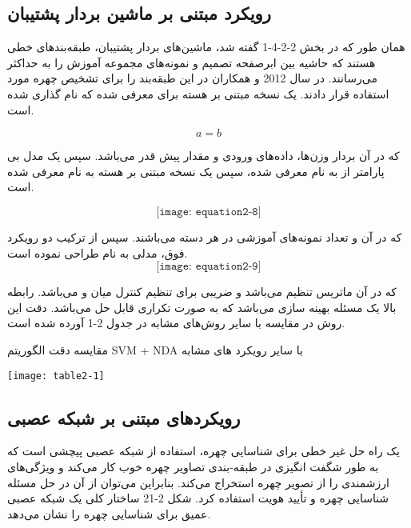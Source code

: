 \subsection{رویکرد مبتنی بر ماشین بردار پشتیبان}
همان طور که در بخش 2-2-4-1 گفته شد، ماشین‌های بردار پشتیبان، طبقه‌بندهای خطی هستند که حاشیه بین ابرصفحه تصمیم و نمونه‌های مجموعه آموزش را به حداکثر می‌رسانند. در سال 2012  و همکاران در \cite{KHAN201266} این طبقه‌بند را برای تشخیص چهره مورد استفاده قرار دادند. یک نسخه مبتنی بر هسته برای  معرفی شده که  نام گذاری شده است.

\begin{equation}\label{eq2-7}
a = b
\end{equation}

\noindent	
که در آن  بردار وزن‌ها،  داده‌های ورودی و  مقدار پیش قدر  می‌باشد. سپس یک مدل بی پارامتر از   به نام   معرفی شده، سپس یک نسخه مبتنی بر هسته  به نام   معرفی شده است. 

\begin{equation}\label{eq2-8}
\texttt{[image: equation2-8]}
\end{equation}

\noindent
که در آن  و  تعداد نمونه‌های آموزشی در هر دسته می‌باشند. سپس از ترکیب دو رویکرد فوق، مدلی به نام  طراحی نموده است. 
\begin{equation}\label{eq2-9}
\texttt{[image: equation2-9]}
\end{equation}	

\noindent
که در آن  ماتریس تنظیم می‌باشد و  ضریبی برای تنظیم کنترل میان  و  می‌باشد. رابطه بالا یک مسئله بهینه سازی می‌باشد که به صورت تکراری قابل حل ‌می‌باشد. دقت این روش در مقایسه با سایر روش‌های مشابه در جدول 2-1 آورده شده است.

\begin{table}
  \caption{ مقایسه دقت الگوریتم SVM + NDA با سایر رویکرد های مشابه}
  \label{tbl:2-1}
  \texttt{[image: table2-1]}
\end{table}
 
\subsection{رویکردهای مبتنی بر شبکه عصبی}
یک راه حل غیر خطی برای شناسایی چهره، استفاده از شبکه‌ عصبی پیچشی است که به طور شگفت انگیزی در طبقه-بندی تصاویر چهره خوب کار می‌کند و ویژگی‌های ارزشمندی را از تصویر چهره استخراج می‌کند. بنابراین می‌توان از آن در حل مسئله شناسایی چهره‌ و تأیید هویت استفاده کرد. شکل 2-21 ساختار کلی یک شبکه عصبی عمیق برای شناسایی چهره را نشان می‌دهد.
 

